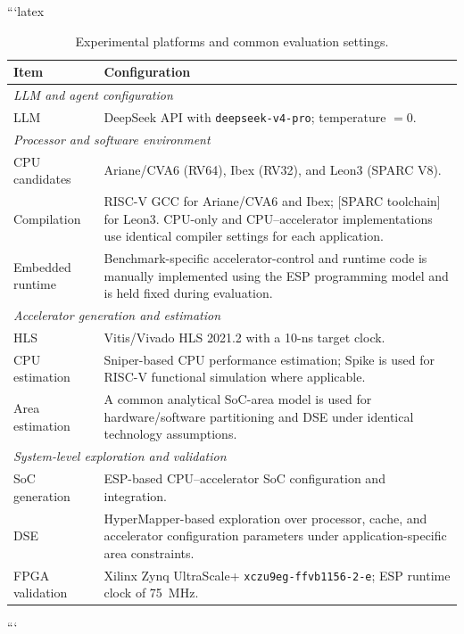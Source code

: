 ```latex
\begin{table}[t]
\centering
\caption{Experimental platforms and common evaluation settings.}
\label{tab:experimental_setup}
\renewcommand{\arraystretch}{1.10}
\setlength{\tabcolsep}{4pt}

\begin{tabularx}{\columnwidth}{p{}X}
\toprule
\textbf{Item} & \textbf{Configuration} \\
\midrule

\multicolumn{2}{l}{\textit{LLM and agent configuration}} \\
LLM &
DeepSeek API with \texttt{deepseek-v4-pro}; temperature $=0$. \\

\midrule
\multicolumn{2}{l}{\textit{Processor and software environment}} \\
CPU candidates &
Ariane/CVA6 (RV64), Ibex (RV32), and Leon3 (SPARC V8). \\

Compilation &
RISC-V GCC for Ariane/CVA6 and Ibex; [SPARC toolchain] for Leon3.
CPU-only and CPU--accelerator implementations use identical compiler
settings for each application. \\

Embedded runtime &
Benchmark-specific accelerator-control and runtime code is manually
implemented using the ESP programming model and is held fixed during
evaluation. \\

\midrule
\multicolumn{2}{l}{\textit{Accelerator generation and estimation}} \\
HLS &
Vitis/Vivado HLS 2021.2 with a 10-ns target clock. \\

CPU estimation &
Sniper-based CPU performance estimation; Spike is used for RISC-V
functional simulation where applicable. \\

Area estimation &
A common analytical SoC-area model is used for hardware/software
partitioning and DSE under identical technology assumptions. \\

\midrule
\multicolumn{2}{l}{\textit{System-level exploration and validation}} \\
SoC generation &
ESP-based CPU--accelerator SoC configuration and integration. \\

DSE &
HyperMapper-based exploration over processor, cache, and accelerator
configuration parameters under application-specific area constraints. \\

FPGA validation &
Xilinx Zynq UltraScale+ \texttt{xczu9eg-ffvb1156-2-e};
ESP runtime clock of 75~MHz. \\

\bottomrule
\end{tabularx}
\end{table}
```


